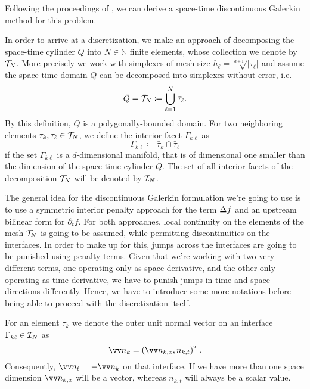 \documentclass[../thesis.tex]{subfiles}
\begin{document}
Following the proceedings of \cite[Chapter 2]{Neumueller}, we can derive a space-time discontinuous Galerkin method for this problem.

In order to arrive at a discretization, we make an approach of decomposing the space-time cylinder $Q$ into $N \in \mathbb{N}$ finite elements, whose collection we denote by $\mathcal{T}_N$. More precisely we work with simplexes of mesh size $h_\ell = \sqrt[d+1]{|\tau_\ell|}$ and assume the space-time domain $Q$ can be decomposed into simplexes without error, i.e.
\[
	\bar{Q} = \bar{\mathcal{T}}_N \coloneqq \bigcup_{\ell=1}^N \bar{\tau}_\ell.
\]
By this definition, $Q$ is a polygonally-bounded domain.
For two neighboring elements $\tau_k, \tau_\ell \in \mathcal{T}_N$, we define the interior facet $\Gamma_{k \ell}$ as
\[
	\Gamma_{k \ell} \coloneqq \bar{\tau}_k \cap \bar{\tau}_\ell
\]
if the set $\Gamma_{k \ell}$ is a $d$-dimensional manifold, that is of dimensional one smaller than the dimension of the space-time cylinder $Q$. The set of all interior facets of the decomposition $\mathcal{T}_N$ will be denoted by $\mathcal{I}_N$.

The general idea for the discontinuous Galerkin formulation we're going to use is to use a symmetric interior penalty approach for the term $\Delta f$ and an upstream bilinear form for $\partial_t f$.
For both approaches, local continuity on the elements of the mesh $\mathcal{T}_N$ is going to be assumed, while permitting discontinuities on the interfaces. In order to make up for this, jumps across the interfaces are going to be punished using penalty terms.
Given that we're working with two very different terms, one operating only as space derivative, and the other only operating as time derivative, we have to punish jumps in time and space directions differently.
Hence, we have to introduce some more notations before being able to proceed with the discretization itself.

For an element $\tau_k$ we denote the outer unit normal vector on an interface $\Gamma_{k \ell} \in \mathcal{I}_N$ as
\[
	\markvec{n_k} = \left( \markvec{n_{k, x}}, n_{k, t} \right)^\tp.
\]
Consequently, $\markvec{n_\ell} = - \markvec{n_k}$ on that interface.
If we have more than one space dimension $\markvec{n_{k, x}}$ will be a vector, whereas $n_{k, t}$ will always be a scalar value.
\end{document}

